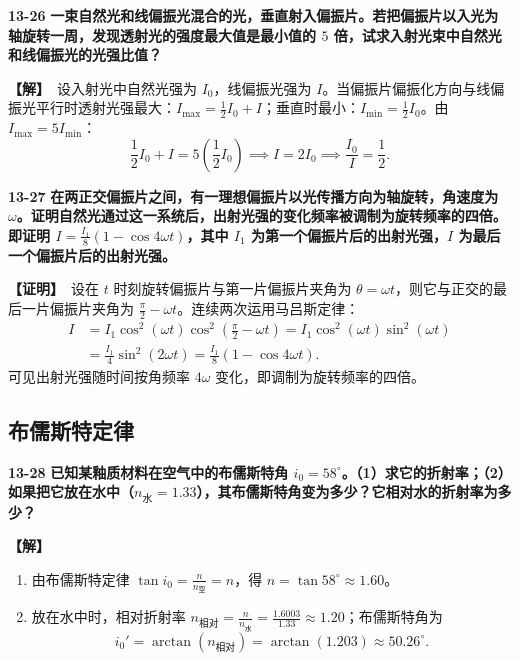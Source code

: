 \documentclass[zihao=5,a4paper,UTF8]{ctexart}
\newenvironment{prob}[2]{%
    \par\vspace{6pt}\noindent\textbf{\color{navy}#1} \textbf{#2}\par\nopagebreak\vspace{2pt}%
}{%
    \par\vspace{4pt}%
}
\newcommand{\sol}{\noindent\textbf{\color{tealaccent}【解】}\ }
\newcommand{\proofbegin}{\noindent\textbf{\color{tealaccent}【证明】}\ }
\begin{document}
\begin{prob}{13-26}{一束自然光和线偏振光混合的光，垂直射入偏振片。若把偏振片以入光为轴旋转一周，发现透射光的强度最大值是最小值的 $5$ 倍，试求入射光束中自然光和线偏振光的光强比值？}
\sol 设入射光中自然光强为 $I_0$，线偏振光强为 $I$。当偏振片偏振化方向与线偏振光平行时透射光强最大：$I_{\max} = \frac{1}{2}I_0 + I$；垂直时最小：$I_{\min} = \frac{1}{2}I_0$。由 $I_{\max} = 5I_{\min}$：
\[
    \frac{1}{2}I_0 + I = 5\left(\frac{1}{2}I_0\right) \implies I = 2I_0 \implies \frac{I_0}{I} = \frac{1}{2}.
\]
\end{prob}

\begin{prob}{13-27}{在两正交偏振片之间，有一理想偏振片以光传播方向为轴旋转，角速度为 $\omega$。证明自然光通过这一系统后，出射光强的变化频率被调制为旋转频率的四倍。即证明 $I = \frac{I_1}{8}(1 - \cos 4\omega t)$，其中 $I_1$ 为第一个偏振片后的出射光强，$I$ 为最后一个偏振片后的出射光强。}
\proofbegin 设在 $t$ 时刻旋转偏振片与第一片偏振片夹角为 $\theta = \omega t$，则它与正交的最后一片偏振片夹角为 $\frac{\pi}{2} - \omega t$。连续两次运用马吕斯定律：
\begin{align*}
    I &= I_1\cos^2(\omega t)\cos^2\left(\frac{\pi}{2} - \omega t\right) = I_1\cos^2(\omega t)\sin^2(\omega t) \\
      &= \frac{I_1}{4}\sin^2(2\omega t) = \frac{I_1}{8}(1 - \cos 4\omega t).
\end{align*}
可见出射光强随时间按角频率 $4\omega$ 变化，即调制为旋转频率的四倍。
\end{prob}

\subsection{布儒斯特定律}

\begin{prob}{13-28}{已知某釉质材料在空气中的布儒斯特角 $i_0=58^\circ$。（1）求它的折射率；（2）如果把它放在水中（$n_{\text{水}}=1.33$），其布儒斯特角变为多少？它相对水的折射率为多少？}
\sol
\begin{enumerate}[leftmargin=2em, itemsep=2pt]
    \item 由布儒斯特定律 $\tan i_0 = \frac{n}{n_{\text{空}}} = n$，得 $n = \tan 58^\circ \approx 1.60$。
    \item 放在水中时，相对折射率 $n_{\text{相对}} = \frac{n}{n_{\text{水}}} = \frac{1.6003}{1.33} \approx 1.20$；布儒斯特角为
    \[
        i_0' = \arctan(n_{\text{相对}}) = \arctan(1.203) \approx 50.26^\circ.
    \]
\end{enumerate}
\end{prob}
\end{document}
